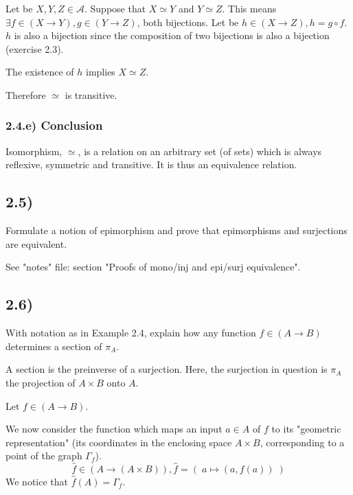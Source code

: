 \documentclass[12pt, letterpaper, twoside]{report}
\begin{document}
Let be $X, Y, Z \in \mathcal{A}$.
Suppose that $X \simeq Y$ and $Y \simeq Z$.
This means $\exists f \in (X \to Y), g \in (Y \to Z)$, both bijections.
Let be $h \in (X \to Z), h = g \circ f$. $h$ is also a bijection since the composition of two bijections is also a bijection (exercise 2.3).


The existence of $h$ implies $X \simeq Z$.

Therefore $\simeq$ is transitive.


\subsubsection*{2.4.e) Conclusion}

Isomorphism, $\simeq$, is a relation on an arbitrary set (of sets) which is always reflexive, symmetric and transitive. It is thus an equivalence relation.



\subsection*{2.5)}

Formulate a notion of epimorphism and prove that epimorphisms and surjections are equivalent.

See "notes" file: section "Proofs of mono/inj and epi/surj equivalence".


\subsection*{2.6)}

With notation as in Example 2.4, explain how any function $f \in (A \to B)$ determines a section of $\pi_A$.

A section is the preinverse of a surjection. Here, the surjection in question is $\pi_A$ the projection of $A \times B$ onto $A$.

Let $f \in (A \to B)$.


We now consider the function which maps an input $a \in A$ of $f$ to its "geometric representation" (its coordinates in the enclosing space $A \times B$, corresponding to a point of the graph $\Gamma_f$). 
$$\hat{f} \in (A \to (A \times B)), \hat{f} = ( \; a \mapsto (a, f(a)) \; )$$
We notice that $\hat{f}(A) = \Gamma_f$.
\end{document}
